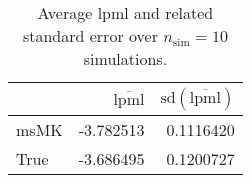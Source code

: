 \begin{table}[H]

\caption{Average lpml and related standard error over $n_{\text{sim}} = 10$ simulations.}
\centering
\begin{tabular}[t]{lrr}
\toprule
  & $\overbar{\text{lpml}}$ & $\text{sd}(\overbar{\text{lpml}})$\\
\midrule
msMK & -3.782513 & 0.1116420\\
True & -3.686495 & 0.1200727\\
\bottomrule
\end{tabular}
\end{table}